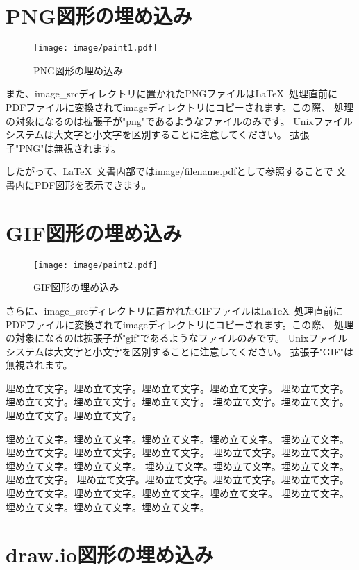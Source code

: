 \section{PNG図形の埋め込み}


\begin{wrapfigure}[10]{O}[0pt]{0\textwidth}
    \texttt{[image: image/paint1.pdf]}
    \caption{PNG図形の埋め込み}\label{embeded_png}
\end{wrapfigure}

また、image\_srcディレクトリに置かれたPNGファイルは\LaTeX\
処理直前にPDFファイルに変換されてimageディレクトリにコピーされます。この際、
処理の対象になるのは拡張子が"png"であるようなファイルのみです。
Unixファイルシステムは大文字と小文字を区別することに注意してください。
拡張子"PNG"は無視されます。

したがって、\LaTeX\ 文書内部ではimage/filename.pdfとして参照することで
文書内にPDF図形を表示できます。




\section{GIF図形の埋め込み}

\begin{wrapfigure}[10]{O}[0pt]{0\textwidth}
    \texttt{[image: image/paint2.pdf]}
    \caption{GIF図形の埋め込み}\label{embeded_gif}
\end{wrapfigure}


さらに、image\_srcディレクトリに置かれたGIFファイルは\LaTeX\
処理直前にPDFファイルに変換されてimageディレクトリにコピーされます。この際、
処理の対象になるのは拡張子が"gif"であるようなファイルのみです。
Unixファイルシステムは大文字と小文字を区別することに注意してください。
拡張子"GIF"は無視されます。

埋め立て文字。埋め立て文字。埋め立て文字。埋め立て文字。
埋め立て文字。埋め立て文字。埋め立て文字。埋め立て文字。
埋め立て文字。埋め立て文字。埋め立て文字。埋め立て文字。

埋め立て文字。埋め立て文字。埋め立て文字。埋め立て文字。
埋め立て文字。埋め立て文字。埋め立て文字。埋め立て文字。
埋め立て文字。埋め立て文字。埋め立て文字。埋め立て文字。
埋め立て文字。埋め立て文字。埋め立て文字。埋め立て文字。
埋め立て文字。埋め立て文字。埋め立て文字。埋め立て文字。
埋め立て文字。埋め立て文字。埋め立て文字。埋め立て文字。
埋め立て文字。埋め立て文字。埋め立て文字。埋め立て文字。


\section{draw.io図形の埋め込み}

